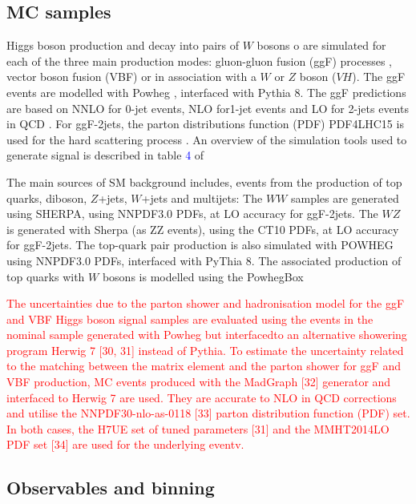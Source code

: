 \subsection{MC samples}

Higgs boson production and decay into pairs of $W$ bosons o are simulated for each of the three main production modes: gluon-gluon fusion (ggF) processes \cite{Aggarwal2743995}, vector boson fusion (VBF) \cite{Abidi2752167} or in association with a $W$ or $Z$ boson ($VH$). The ggF events are modelled with Powheg \cite{2004}, interfaced with Pythia 8\cite{Frixione_2007}. The ggF predictions are based on NNLO for 0-jet events, NLO for1-jet events and LO for 2-jets events in QCD \cite{2010,Abidi2752167}. For ggF-2jets, the parton distributions function (PDF) PDF4LHC15 is used for the hard scattering process \cite{Aggarwal2743995}. An overview of the simulation tools used to generate signal is described in table \textcolor{blue}{4} of \cite{Aggarwal2743995}


The main sources of SM background includes, events from the production of top quarks, diboson, $Z$+jets, $W$+jets and multijets:  The $WW$ samples are generated using SHERPA, using NNPDF3.0 PDFs, at LO accuracy for ggF-2jets. The $WZ$ is generated with Sherpa (as ZZ events), using the CT10 PDFs, at LO accuracy for ggF-2jets. The top-quark pair production is also simulated with POWHEG using NNPDF3.0 PDFs, interfaced with PyThia 8. The associated production of top quarks with $W$ bosons is modelled using the PowhegBox




\textcolor{red}{The uncertainties due to the parton shower and hadronisation model for the ggF and VBF Higgs boson  signal samples are evaluated using the events in the nominal sample generated with Powheg but interfacedto an alternative showering program Herwig 7 [30, 31] instead of Pythia. To estimate the uncertainty related to the matching between the matrix element and the parton shower for ggF and VBF production, MC events produced with the MadGraph [32] generator and interfaced to Herwig 7 are used. They are accurate to NLO in QCD corrections and utilise the NNPDF30-nlo-as-0118 [33] parton distribution function (PDF) set. In both cases, the H7UE set of tuned parameters [31] and the MMHT2014LO PDF set [34] are used for the underlying eventv.}


\newpage
\subsection{Observables and binning}

